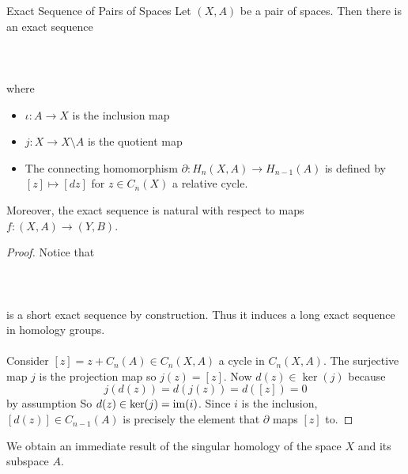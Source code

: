 \documentclass[a4paper]{article}
\begin{document}
\begin{thm}{Exact Sequence of Pairs of Spaces}{} Let $(X,A)$ be a pair of spaces. Then there is an exact sequence \\~\\
\\~\\
where 
\begin{itemize}
\item $\iota:A\to X$ is the inclusion map
\item $j:X\to X\setminus A$ is the quotient map
\item The connecting homomorphism $\partial:H_n(X,A)\to H_{n-1}(A)$ is defined by $[z]\mapsto[dz]$ for $z\in C_n(X)$ a relative cycle. 
\end{itemize}
Moreover, the exact sequence is natural with respect to maps $f:(X,A)\to(Y,B)$. \tcbline
\begin{proof}
Notice that \\~\\
\\~\\
is a short exact sequence by construction. Thus it induces a long exact sequence in homology groups. \\~\\

Consider $[z]=z+C_n(A)\in C_n(X,A)$ a cycle in $C_n(X,A)$. The surjective map $j$ is the projection map so $j(z)=[z]$. Now $d(z)\in\ker(j)$ because $$j(d(z))=d(j(z))=d([z])=0$$ by assumption So $d(z)\in\ker(j)=\operatorname{im}(i)$. Since $i$ is the inclusion, $[d(z)]\in C_{n-1}(A)$ is precisely the element that $\partial$ maps $[z]$ to. 
\end{proof}
\end{thm}

We obtain an immediate result of the singular homology of the space $X$ and its subspace $A$. 
\end{document}
